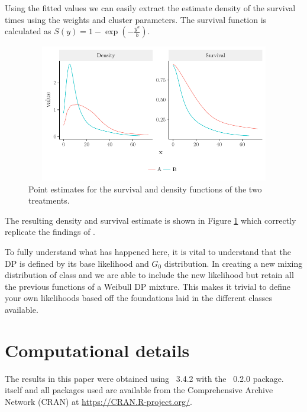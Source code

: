 \documentclass[nojss]{jss}
\begin{document}
Using the fitted values we can easily extract the estimate density of the survival times using the weights and cluster parameters. The survival function is calculated as $S(y) = 1 - \exp(- \frac{y ^a}{b})$.
\begin{figure}
\centering
\includegraphics[height=60mm, width=120mm]{img/weibull_censor_graph.pdf}
\caption{Point estimates for the survival and density functions of the two treatments.}
\label{fig:weibull_cens}
\end{figure}
The resulting density and survival estimate is shown in Figure \ref{fig:weibull_cens} which correctly replicate the findings of \cite{kottas_nonparametric_2006}.

To fully understand what has happened here, it is vital to understand that the DP is defined by its base likelihood and $G_0$ distribution. In creating a new mixing distribution of class  and  we are able to include the new likelihood but retain all the previous functions of a Weibull DP mixture. This makes it trivial to define your own likelihoods based off the foundations laid in the different classes available.

\section*{Computational details}


The results in this paper were obtained using
~3.4.2 with the
~0.2.0 package.  itself
and all packages used are available from the Comprehensive
 Archive Network (CRAN) at
\url{https://CRAN.R-project.org/}.
\end{document}
